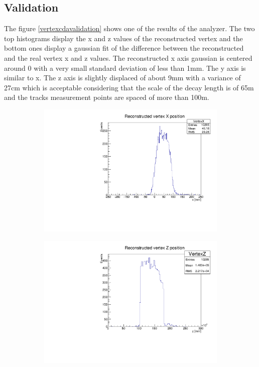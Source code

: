 \subsection{Validation}
The figure \ref{vertexcdavalidation} shows one of the results  of the  analyzer.
The two top histograms display the x and z values of the reconstructed vertex and the bottom ones
display a gaussian fit of the difference between the reconstructed and the real vertex x and z
values. The reconstructed x axis gaussian is centered around 0 with a very small standard deviation
of less than 1mm. The y axis is similar to x. The z axis is slightly displaced of about 9mm with a
variance of 27cm which is acceptable considering that the scale of the decay length is of 65m and the tracks measurement
points are spaced of more than 100m.
\begin{figure}
\begin{subfigure}{0.5\textwidth}
\includegraphics[width=\textwidth]{cdax}
\end{subfigure}
\begin{subfigure}{0.5\textwidth}
\includegraphics[width=\textwidth]{cdaz}

\end{subfigure}
\end{figure}
